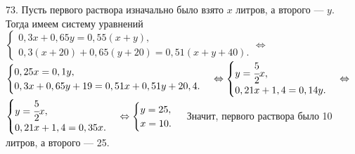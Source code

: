 73. Пусть первого раствора изначально было взято $x$ литров, а второго --- $y.$ Тогда имеем систему уравнений $\begin{cases} 0,3x+0,65y=0,55(x+y),\\
0,3(x+20)+0,65(y+20)=0,51(x+y+40).\end{cases}\Leftrightarrow$\\$\begin{cases} 0,25x=0,1y,\\
0,3x+0,65y+19=0,51x+0,51y+20,4.\end{cases}\Leftrightarrow\begin{cases} y=\cfrac{5}{2}x,\\
0,21x+1,4=0,14y.\end{cases}\Leftrightarrow$\\$\begin{cases} y=\cfrac{5}{2}x,\\
0,21x+1,4=0,35x.\end{cases}\Leftrightarrow\begin{cases} y=25,\\
x=10.\end{cases}$ Значит, первого раствора было 10 литров, а второго --- 25.\\
